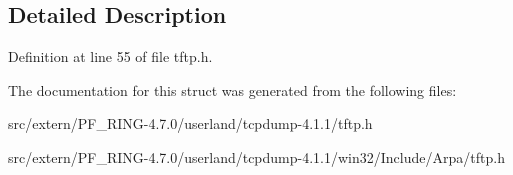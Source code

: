 \subsection{Detailed Description}


Definition at line 55 of file tftp.h.



The documentation for this struct was generated from the following files:\begin{DoxyCompactItemize}
\item 
src/extern/PF\_\-RING-\/4.7.0/userland/tcpdump-\/4.1.1/tftp.h\item 
src/extern/PF\_\-RING-\/4.7.0/userland/tcpdump-\/4.1.1/win32/Include/Arpa/tftp.h\end{DoxyCompactItemize}
